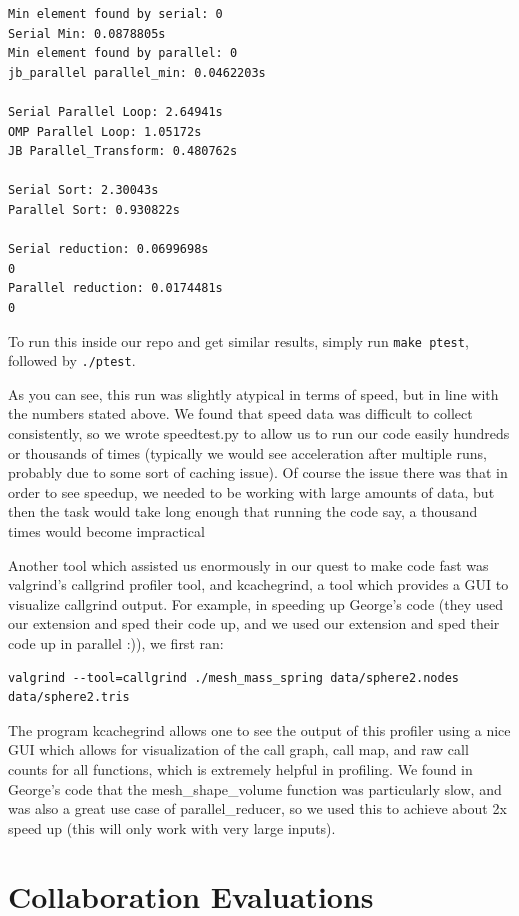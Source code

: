 \documentclass{article}
\begin{document}
\begin{verbatim}
Min element found by serial: 0
Serial Min: 0.0878805s
Min element found by parallel: 0
jb_parallel parallel_min: 0.0462203s

Serial Parallel Loop: 2.64941s
OMP Parallel Loop: 1.05172s
JB Parallel_Transform: 0.480762s

Serial Sort: 2.30043s
Parallel Sort: 0.930822s

Serial reduction: 0.0699698s
0
Parallel reduction: 0.0174481s
0
\end{verbatim}

To run this inside our repo and get similar results, simply run \texttt{make ptest}, followed by \texttt{./ptest}.

As you can see, this run was slightly atypical in terms of speed, but in line with the numbers stated above.  We found that speed data was difficult to collect consistently, so we wrote speedtest.py to allow us to run our code easily hundreds or thousands of times (typically we would see acceleration after multiple runs, probably due to some sort of caching issue).  Of course the issue there was that in order to see speedup, we needed to be working with large amounts of data, but then the task would take long enough that running the code say, a thousand times would become impractical

Another tool which assisted us enormously in our quest to make code fast was valgrind's callgrind profiler tool, and kcachegrind, a tool which provides a GUI to visualize callgrind output.  For example, in speeding up George's code (they used our extension and sped their code up, and we used our extension and sped their code up in parallel :)), we first ran:

\begin{verbatim}
valgrind --tool=callgrind ./mesh_mass_spring data/sphere2.nodes data/sphere2.tris
\end{verbatim}

The program kcachegrind allows one to see the output of this profiler using a nice GUI which allows for visualization of the call graph, call map, and raw call counts for all functions, which is extremely helpful in profiling.  We found in George's code that the mesh\_shape\_volume function was particularly slow, and was also a great use case of parallel\_reducer, so we used this to achieve about 2x speed up (this will only work with very large inputs). 



\section{Collaboration Evaluations}
\end{document}
